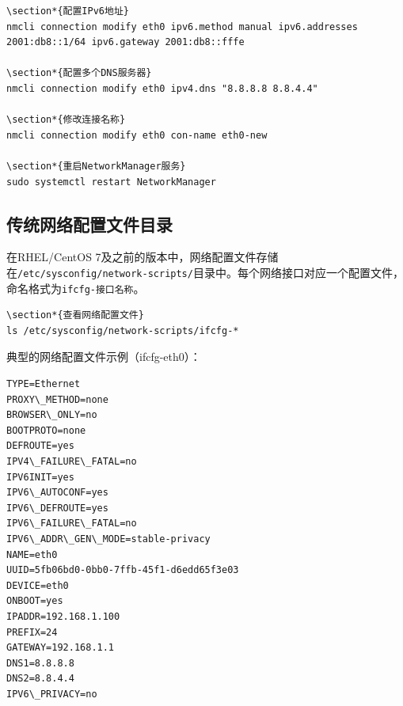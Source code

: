 \documentclass[12pt,UTF8]{ctexbook}
\begin{document}
\begin{verbatim}
\section*{配置IPv6地址}
nmcli connection modify eth0 ipv6.method manual ipv6.addresses 2001:db8::1/64 ipv6.gateway 2001:db8::fffe

\section*{配置多个DNS服务器}
nmcli connection modify eth0 ipv4.dns "8.8.8.8 8.8.4.4"

\section*{修改连接名称}
nmcli connection modify eth0 con-name eth0-new

\section*{重启NetworkManager服务}
sudo systemctl restart NetworkManager
\end{verbatim}

\subsection{传统网络配置文件目录}

在RHEL/CentOS 7及之前的版本中，网络配置文件存储在\texttt{/etc/sysconfig/network-scripts/}目录中。每个网络接口对应一个配置文件，命名格式为\texttt{ifcfg-接口名称}。

\begin{verbatim}
\section*{查看网络配置文件}
ls /etc/sysconfig/network-scripts/ifcfg-*
\end{verbatim}

典型的网络配置文件示例（ifcfg-eth0）：

\begin{verbatim}
TYPE=Ethernet
PROXY\_METHOD=none
BROWSER\_ONLY=no
BOOTPROTO=none
DEFROUTE=yes
IPV4\_FAILURE\_FATAL=no
IPV6INIT=yes
IPV6\_AUTOCONF=yes
IPV6\_DEFROUTE=yes
IPV6\_FAILURE\_FATAL=no
IPV6\_ADDR\_GEN\_MODE=stable-privacy
NAME=eth0
UUID=5fb06bd0-0bb0-7ffb-45f1-d6edd65f3e03
DEVICE=eth0
ONBOOT=yes
IPADDR=192.168.1.100
PREFIX=24
GATEWAY=192.168.1.1
DNS1=8.8.8.8
DNS2=8.8.4.4
IPV6\_PRIVACY=no
\end{verbatim}
\end{document}
